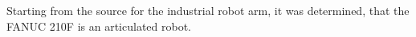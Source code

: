 Starting from the source for the industrial robot arm, it was determined, that the FANUC 210F is an articulated robot.


















%
%
%
%
